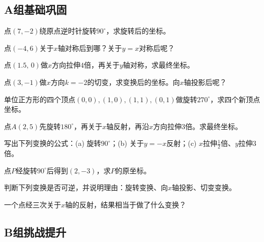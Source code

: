 \subsection*{A组\quad 基础巩固}

\begin{exercise}
\item 点$(7,-2)$绕原点逆时针旋转$90^\circ$，求旋转后的坐标。
\item 点$(-4,6)$关于$x$轴对称后到哪？关于$y=x$对称后呢？
\item 点$(1.5,\,0)$做$x$方向拉伸$4$倍，再关于$y$轴对称，求最终坐标。
\item 点$(3,-1)$做$x$方向$k=-2$的切变，求变换后的坐标。向$x$轴投影后呢？
\item 单位正方形的四个顶点$(0,0),(1,0),(1,1),(0,1)$做旋转$270^\circ$，求四个新顶点坐标。
\item 点$A(2,5)$先旋转$180^\circ$，再关于$x$轴反射，再沿$x$方向拉伸$3$倍。求最终坐标。
\item 写出下列变换的公式：(a) 旋转$90^\circ$；(b) 关于$y=-x$反射；(c) $x$拉伸$\frac12$倍、$y$拉伸$3$倍。
\item 点$P$经旋转$90^\circ$后得到$(2,-3)$，求$P$的原坐标。
\item 判断下列变换是否可逆，并说明理由：旋转变换、向$x$轴投影、切变变换。
\item 一个点经三次关于$x$轴的反射，结果相当于做了什么变换？
\end{exercise}

\subsection*{B组\quad 挑战提升}

